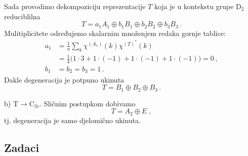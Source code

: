 \begin{primjer}
Sada provodimo dekompoziciju reprezentacije $T$ koja je u kontekstu
grupe D$_2$ reduciblilna
\begin{displaymath}
   T = a_1 A_1 \oplus b_1 B_1 \oplus b_2 B_2 \oplus b_3 B_3 \,.
\end{displaymath}
Mulitiplicitete određujemo skalarnim množenjem redaka gornje tablice:
\begin{align*}
a_1 &= \frac{1}{n}\sum_k \chi^{(A_1)}(k) \chi^{(T)^*}(k)  \\
    &= \frac{1}{4}\big(1\cdot3 + 1\cdot(-1) + 1\cdot(-1) + 1\cdot(-1)\big) = 0 \,, \\
b_1 &= b_2 = b_3 = 1 \,.
\end{align*}
Dakle degeneracija je potpuno ukinuta
\begin{displaymath}
  T =  B_1 \oplus B_2 \oplus B_3 \,.
\end{displaymath}

\centerline{}

b) $\mathrm{T}\to \mathrm{C}_{3v}$. Sličnim postupkom dobivamo
\begin{displaymath}
        T = A_2 \oplus E \;,
\end{displaymath}
tj. degeneracija je samo djelomično ukinuta.

\centerline{}
\end{primjer}

\subsection*{Zadaci}

